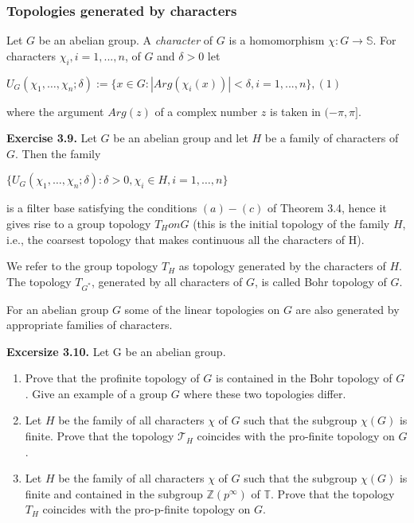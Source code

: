 \documentclass[12pt]{article}
\begin{document}
\subsubsection{Topologies generated by characters}


Let $G$ be an abelian group. A \emph{character} of $G$ is a homomorphism $\chi : G \to \mathbb{S}$. For characters $\chi_i , i = 1, . . . , n$, of
$G$ and $\delta > 0$ let


$U_G (\chi_1, \dots, \chi_n; \delta) := \{x \in G : |Arg (\chi_i(x))| < \delta, i = 1, . . . , n\},   (1)$


where the argument $Arg (z)$ of a complex number $z$ is taken in $(-\pi, \pi]$. 


\textbf{Exercise 3.9.} Let $G$ be an abelian group and let $H$ be a family of characters of $G$. Then the family


        $\{U_G(\chi_1, \dots, \chi_n; \delta): \delta > 0, \chi_i \in H, i = 1, \dots, n\}$


        is a filter base satisfying the conditions $(a)-(c)$ of Theorem 3.4, hence it gives rise to a group topology $T_H on G$
    (this is the initial topology of the family $H$, i.e., the coarsest topology that makes continuous all the characters
    of H).


We refer to the group topology $T_H$ as topology generated by the characters of $H$. The topology $T_{G^*}$, generated
by all characters of $G$, is called Bohr topology of $G$.


For an abelian group $G$ some of the linear topologies on $G$ are also generated by appropriate families of
characters.

\textbf{Excersize 3.10.} Let G be an abelian group.

    \begin{enumerate}
        \item Prove that the profinite topology of $G$ is contained in the Bohr topology of $G$. Give an example of a group
            $G$ where these two topologies differ.

        \item Let $H$ be the family of all characters $\chi$ of $G$ such that the subgroup $\chi(G)$ is finite. Prove that the topology
            $\mathcal{T}_H$ coincides with the pro-finite topology on $G$.

        \item Let $H$ be the family of all characters $\chi$ of $G$ such that the subgroup $\chi(G)$ is finite and contained in the
            subgroup $\mathbb{Z}(p^{\infty})$ of $\mathbb{T}$. Prove that the topology $T_H$ coincides with the pro-p-finite topology on $G$.

    \end{enumerate}
\end{document}

